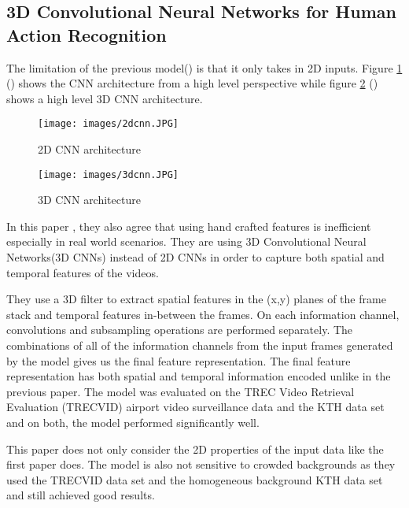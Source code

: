 \subsection{3D Convolutional Neural Networks for Human Action Recognition}
 \vspace{0.1in}
 \par
The limitation of the previous model(\cite{geng2015human}) is that it only takes in 2D inputs. Figure \ref{fig:2D} (\cite{geng2015human}) shows the CNN architecture from a high level perspective while figure \ref{fig:3D} (\cite{ji20133d}) shows a high level 3D CNN architecture.
\begin{figure}[h!]
	\texttt{[image: images/2dcnn.JPG]} 
	\caption{2D CNN architecture}
	\label{fig:2D}
\end{figure}	
 \par
\vspace{0.4in}
\begin{figure}[h!]
\texttt{[image: images/3dcnn.JPG]} 
\caption{3D CNN architecture}
\label{fig:3D}
\end{figure}
 \par
\vspace{0.4in}
In this paper \cite{ji20133d}, they also agree that using hand crafted features is inefficient especially in real world scenarios. They are using 3D Convolutional Neural Networks(3D CNNs) instead of 2D CNNs in order to capture both spatial and temporal features of the videos. \vspace{0.1in} 

They use a 3D filter to extract spatial features in the (x,y) planes of the frame stack and temporal features in-between the frames. On each information channel, convolutions and subsampling operations are performed separately. The combinations of all of the information channels from the input frames generated by the model gives us the final feature representation. The final feature representation has both spatial and temporal information encoded unlike in the previous paper. The model was evaluated on the TREC Video Retrieval Evaluation (TRECVID) airport video surveillance data and the KTH data set and on both, the model performed significantly well.\vspace{0.1in}

This paper does not only consider the 2D properties of the input data like the first paper does. The model is also not sensitive to crowded backgrounds as they used the TRECVID data set and the homogeneous background KTH data set and still achieved good results.  



